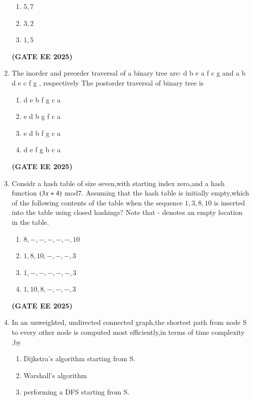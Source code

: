 \documentclass[journal,12pt,onecolumn]{IEEEtran}
\theoremstyle{remark}
\begin{document}
\begin{enumerate}
\begin{enumerate}
        \item $5,7$
        \item $3,2$
        \item $1,5$
    \end{enumerate}
    \hfill \textbf{(GATE EE 2025)}
         \item The inorder and preorder traversal  of a binary tree  are:
         \newline
         d b e a f c g and a b d e c f g , respectively
         \newline
         The postorder traversal of binary tree is 
         \begin{enumerate}
             \item d e b f g c a
             \item e d b g f c a 
             \item e d b f g c a 
             \item d e f g b c a 
         \end{enumerate}
         \hfill \textbf{(GATE EE 2025)}
         \item Considr a hash table of size seven,with starting index zero,and a hash function $\left(3x+4\right)$ mod$7$. Assuming that the hash table is initially empty,which of the following contents of the table when the sequence $1,3,8,10$ is inserted into the table using closed hashings? Note that - denotes an empty location in the table.
         \begin{enumerate}
             \item  $8,-,-,-,-,-,10$
             \item $1,8,10,-,-,-,3$
             \item $1,-,-,-,-,-,3$
             \item $1,10,8,-,-,-,3$
             \end {enumerate}
             \hfill \textbf{(GATE EE 2025)}
              
             \item In an unweighted, undirected connected  graph,the shortest path from node S to  every other node is computed most efficiently,in terms of time complexity ,by
             \begin{enumerate}
                 \item  Dijkstra's algorithm starting from S.
                 \item Warshall's algorithm
                 \item  performing a DFS starting from S.
                 

\end{enumerate}
\end{enumerate}
\end{document}
